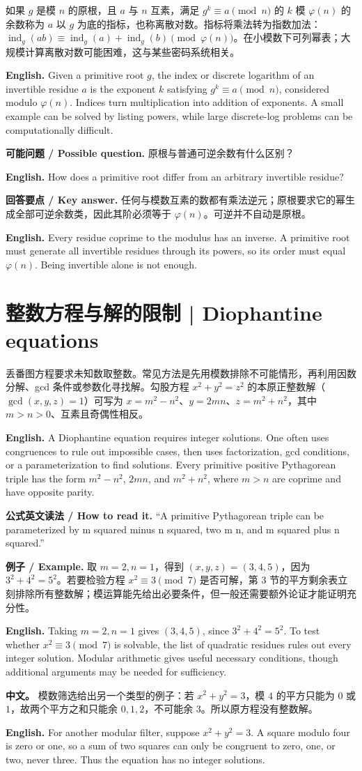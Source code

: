\documentclass[UTF8,11pt,a4paper]{ctexart}
\newcommand{\EN}[1]{\par\noindent \textbf{English.} #1\par}
\newcommand{\BOTH}[2]{\par\noindent\textbf{中文。} #1\par\noindent\textbf{English.} #2\par}
\newcommand{\READ}[1]{\par\noindent \textbf{公式英文读法 / How to read it.} #1\par}
\newcommand{\EX}[2]{\par\noindent \textbf{例子 / Example.} #1\par\EN{#2}}
\newcommand{\ASK}[4]{\par\noindent \textbf{可能问题 / Possible question.} #1\par\EN{#2}\noindent \textbf{回答要点 / Key answer.} #3\par\EN{#4}\medskip}
\begin{document}
\noindent 如果 $g$ 是模 $n$ 的原根，且 $a$ 与 $n$ 互素，满足 $g^k\equiv a\pmod n$ 的 $k$ 模 $\varphi(n)$ 的余数称为 $a$ 以 $g$ 为底的指标，也称离散对数。指标将乘法转为指数加法：$\operatorname{ind}_g(ab)\equiv\operatorname{ind}_g(a)+\operatorname{ind}_g(b)\pmod{\varphi(n)}$。在小模数下可列幂表；大规模计算离散对数可能困难，这与某些密码系统相关。
\EN{Given a primitive root $g$, the index or discrete logarithm of an invertible residue $a$ is the exponent $k$ satisfying $g^k\equiv a\pmod n$, considered modulo $\varphi(n)$. Indices turn multiplication into addition of exponents. A small example can be solved by listing powers, while large discrete-log problems can be computationally difficult.}

\ASK{原根与普通可逆余数有什么区别？}{How does a primitive root differ from an arbitrary invertible residue?}{任何与模数互素的数都有乘法逆元；原根要求它的幂生成全部可逆余数类，因此其阶必须等于 $\varphi(n)$。可逆并不自动是原根。}{Every residue coprime to the modulus has an inverse. A primitive root must generate all invertible residues through its powers, so its order must equal $\varphi(n)$. Being invertible alone is not enough.}

\section{整数方程与解的限制 | Diophantine equations}
\noindent 丢番图方程要求未知数取整数。常见方法是先用模数排除不可能情形，再利用因数分解、gcd 条件或参数化寻找解。勾股方程 $x^2+y^2=z^2$ 的本原正整数解（$\gcd(x,y,z)=1$）可写为 $x=m^2-n^2$、$y=2mn$、$z=m^2+n^2$，其中 $m>n>0$、互素且奇偶性相反。
\EN{A Diophantine equation requires integer solutions. One often uses congruences to rule out impossible cases, then uses factorization, gcd conditions, or a parameterization to find solutions. Every primitive positive Pythagorean triple has the form $m^2-n^2$, $2mn$, and $m^2+n^2$, where $m>n$ are coprime and have opposite parity.}
\READ{“A primitive Pythagorean triple can be parameterized by m squared minus n squared, two m n, and m squared plus n squared.”}

\EX{取 $m=2,n=1$，得到 $(x,y,z)=(3,4,5)$，因为 $3^2+4^2=5^2$。若要检验方程 $x^2\equiv3\pmod7$ 是否可解，第 3 节的平方剩余表立刻排除所有整数解；模运算能先给出必要条件，但一般还需要额外论证才能证明充分性。}{Taking $m=2,n=1$ gives $(3,4,5)$, since $3^2+4^2=5^2$. To test whether $x^2\equiv3\pmod7$ is solvable, the list of quadratic residues rules out every integer solution. Modular arithmetic gives useful necessary conditions, though additional arguments may be needed for sufficiency.}
\BOTH{模数筛选给出另一个类型的例子：若 $x^2+y^2=3$，模 $4$ 的平方只能为 $0$ 或 $1$，故两个平方之和只能余 $0,1,2$，不可能余 $3$。所以原方程没有整数解。}{For another modular filter, suppose $x^2+y^2=3$. A square modulo four is zero or one, so a sum of two squares can only be congruent to zero, one, or two, never three. Thus the equation has no integer solutions.}
\end{document}
